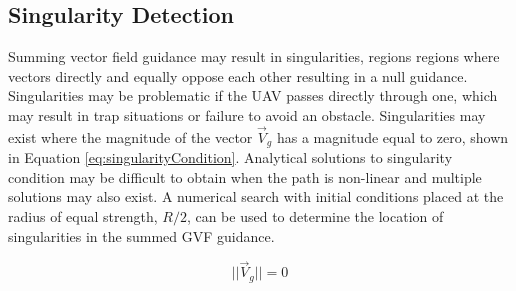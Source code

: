 \documentclass[conf]{new-aiaa}
\begin{document}
\subsection{Singularity Detection}
Summing vector field guidance may result in singularities, regions regions where vectors directly and equally oppose each other resulting in a null guidance. Singularities may be problematic if the UAV passes directly through one, which may result in trap situations or failure to avoid an obstacle. Singularities may exist where the magnitude of the vector $\overrightarrow{V}_g$ has a magnitude equal to zero, shown in Equation \ref{eq:singularityCondition}. Analytical solutions to singularity condition may be difficult to obtain when the path is non-linear and multiple solutions may also exist. A numerical search with initial conditions placed at the radius of equal strength, $R/2$, can be used to determine the location of singularities in the summed GVF guidance. 


 \begin{equation}
\label{eq:singularityCondition}
||\overrightarrow{V}_g || = 0
\end{equation}







 




\end{document}
